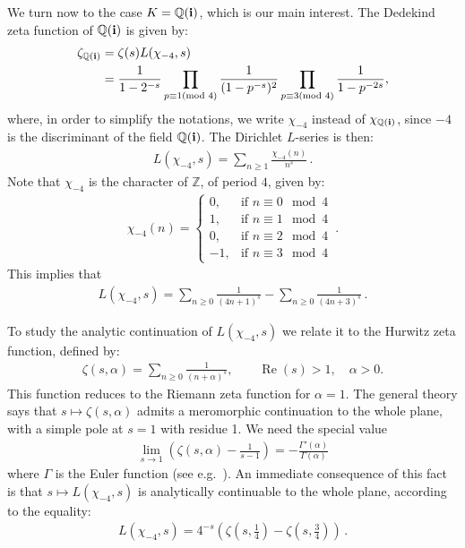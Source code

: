\documentclass[reqno]{amsart}
\theoremstyle{plain}
\theoremstyle{definition}
\theoremstyle{remark}
\numberwithin{equation}{section}
\begin{document}
\bigskip

We turn now to the case $K={{\mathbb Q}}({{\bf i}})$, which is our main interest. The
Dedekind zeta function of ${{\mathbb Q}}({{\bf i}})$ is given by:
\begin{align}
  \label{eq:dedekind_zeta}
  \zeta_{{{\mathbb Q}}({{\bf i}})} &= \zeta(s) L(\chi_{-4},s)\\
                 &= \frac{1}{1-2^{-s}} \prod_{p\equiv 1(\text{mod } 4)}
                   \frac{1}{(1-p^{-s})^2}\prod_{p\equiv 3(\text{mod } 4)}
                   \frac{1}{1-p^{-2s}},\nonumber
\end{align}
where, in order to simplify the notations, we write $\chi_{-4}$
instead of $\chi_{{{\mathbb Q}}({{\bf i}})}$, since $-4$ is the discriminant of the
field ${{\mathbb Q}}({{\bf i}})$.  The Dirichlet $L$-series is then:
\begin{align*}
  L(\chi_{-4},s) = \sum_{n\geq 1} \frac{\chi_{-4}(n)}{n^s}\,.
\end{align*}
Note that $\chi_{-4}$ is the character of ${{\mathbb Z}}$, of period $4$, given
by:
\begin{align*}
  \chi_{-4}(n) = \left\{
  \begin{array}{ll}
    0, & \text{if } n\equiv 0\mod 4\\
    1, & \text{if } n\equiv 1\mod 4\\
    0, & \text{if } n\equiv 2\mod 4\\
    -1, & \text{if } n\equiv 3\mod 4
  \end{array}\right.\,.
\end{align*}
This implies that
\begin{align*}
  L(\chi_{-4},s) = \sum_{n\geq 0} \frac{1}{(4n+1)^s} - \sum_{n\geq 0} \frac{1}{(4n+3)^s}\,.
\end{align*}

\bigskip

To study the analytic continuation of $L(\chi_{-4},s)$ we relate it to
the Hurwitz zeta function, defined by:
\begin{align*}
  \zeta(s,\alpha) = \sum_{n\geq 0} \frac{1}{(n+\alpha)^s},\qquad
  {{\operatorname{Re}}}(s)>1, \quad\alpha>0.
\end{align*}
This function reduces to the Riemann zeta function for $\alpha=1$. The
general theory says that $s\mapsto \zeta(s,\alpha)$ admits a
meromorphic continuation to the whole plane, with a simple pole at
$s=1$ with residue 1. We need the special value
\begin{align*}
  \lim_{s\to 1}\left(\zeta(s,\alpha) - \frac{1}{s-1}\right)
  = -\frac{\Gamma'(\alpha)}{\Gamma(\alpha)}
  
\end{align*}
where $\Gamma$ is the Euler function (see e.g.~\cite{bateman}). An
immediate consequence of this fact is that $s\mapsto L(\chi_{-4},s)$
is analytically continuable to the whole plane, according to the
equality:
\begin{align*}
  L(\chi_{-4},s) = 4^{-s}\left(\zeta\left(s,\frac14\right) - \zeta\left(s,\frac34\right)\right)\,.
\end{align*}
\end{document}

